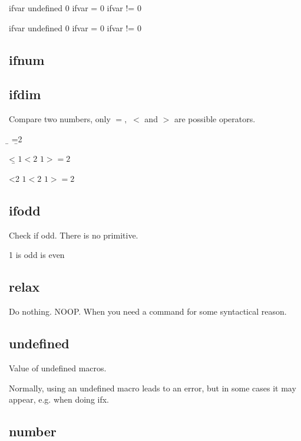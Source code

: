     \def\ifvar{0}

    \ifx\ifvar\undefined
      ifvar undefined
    \else
      \if\ifvar0
        ifvar = 0
      \else
        ifvar != 0
      \fi
    \fi

    \def\ifvar{1}

    \ifx\ifvar\undefined
      ifvar undefined
    \else
      \if\ifvar0
        ifvar = 0
      \else
        ifvar != 0
      \fi
    \fi

  \subsection{ifnum}

  \subsection{ifdim}

    Compare two numbers, only $=,$ $<$ and $>$ are possible operators.

    \newcount\a
    \newcount\b
    \b=2

    \ifnum\a<\b
      $1 < 2$
    \else
      $1 >= 2$
    \fi

    \ifnum\a<2
      $1 < 2$
    \else
      $1 >= 2$
    \fi

  \subsection{ifodd}

    Check if odd. There is no  primitive.

      1 is odd
     is even
    \fi

  \subsection{relax}

    Do nothing. NOOP. When you need a command for some syntactical reason.

    \relax

  \subsection{undefined}

    Value of undefined macros.

    Normally, using an undefined macro leads to an error, but in some cases it may appear, e.g. when doing ifx.

  \subsection{number}

